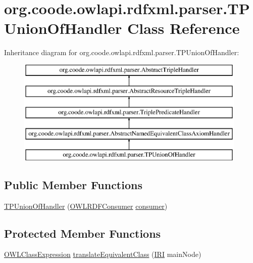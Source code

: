\hypertarget{classorg_1_1coode_1_1owlapi_1_1rdfxml_1_1parser_1_1_t_p_union_of_handler}{\section{org.\-coode.\-owlapi.\-rdfxml.\-parser.\-T\-P\-Union\-Of\-Handler Class Reference}
\label{classorg_1_1coode_1_1owlapi_1_1rdfxml_1_1parser_1_1_t_p_union_of_handler}
}
Inheritance diagram for org.\-coode.\-owlapi.\-rdfxml.\-parser.\-T\-P\-Union\-Of\-Handler\-:\begin{figure}[H]
\begin{center}
\leavevmode
\includegraphics[height=5.000000cm]{classorg_1_1coode_1_1owlapi_1_1rdfxml_1_1parser_1_1_t_p_union_of_handler}
\end{center}
\end{figure}
\subsection*{Public Member Functions}
\begin{DoxyCompactItemize}
\item 
\hyperlink{classorg_1_1coode_1_1owlapi_1_1rdfxml_1_1parser_1_1_t_p_union_of_handler_a08f23cafa0770131d92ca38d7133f1b2}{T\-P\-Union\-Of\-Handler} (\hyperlink{classorg_1_1coode_1_1owlapi_1_1rdfxml_1_1parser_1_1_o_w_l_r_d_f_consumer}{O\-W\-L\-R\-D\-F\-Consumer} \hyperlink{classorg_1_1coode_1_1owlapi_1_1rdfxml_1_1parser_1_1_abstract_triple_handler_a4ccf4d898ff01eb1cadfa04b23d54e9c}{consumer})
\end{DoxyCompactItemize}
\subsection*{Protected Member Functions}
\begin{DoxyCompactItemize}
\item 
\hyperlink{interfaceorg_1_1semanticweb_1_1owlapi_1_1model_1_1_o_w_l_class_expression}{O\-W\-L\-Class\-Expression} \hyperlink{classorg_1_1coode_1_1owlapi_1_1rdfxml_1_1parser_1_1_t_p_union_of_handler_a1e07939c490ba788a143d4873c5ed73e}{translate\-Equivalent\-Class} (\hyperlink{classorg_1_1semanticweb_1_1owlapi_1_1model_1_1_i_r_i}{I\-R\-I} main\-Node)
\end{DoxyCompactItemize}


